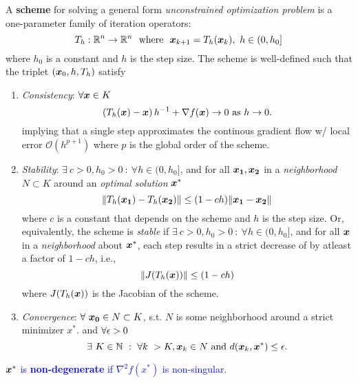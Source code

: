 \documentclass[11pt]{article}
\begin{document}
   

    \begin{definition}
        A \textbf{scheme} for solving a general form \emph{unconstrained optimization problem}
        is a one-parameter family of iteration operators:
        $$
            T_h : \mathbb{R}^n \rightarrow \mathbb{R}^n ~ \text{ where } ~\bm{x}_{k+1} = T_h(\bm{x}_k), ~ h \in (0, h_0]
        $$
        where $h_0$ is a constant and $h$ is the step size. The scheme is well-defined such that
        the triplet $(\bm{x}_0, h, T_h)$ satisfy
        \begin{enumerate}
            \item \emph{Consistency}: $\forall \bm{x} \in K$ 
            $$
                \left( T_h(\bm{x}) - \bm{x} \right) h^{-1} + \nabla f(\bm{x}) \rightarrow 0 \text{ as } h \rightarrow 0.
            $$
            implying that a single step approximates the continous gradient flow w/ local error
            $\mathcal{O}(h^{p+1})$ where $p$ is the global order of the scheme.
            \item \emph{Stability}: $\exists~ c > 0, h_0 > 0 ~:~ \forall h \in (0, h_0]$,
            and for all $\bm{x_1}, \bm{x_2}$ in a \emph{neighborhood $N \subset K$}
            around an \emph{optimal solution} $\bm{x}^*$
            $$
                \| T_h(\bm{x_1}) - T_h(\bm{x_2}) \| \leq (1 - ch) \| \bm{x_1} - \bm{x_2} \|
            $$
            where $c$ is a constant that depends on the scheme and $h$ is the step size.
            Or, equivalently, the scheme is \emph{stable} if
            $\exists~ c > 0, h_0 > 0 ~:~ \forall h \in (0, h_0]$,
            and for all $\bm{x}$ in a \emph{neighborhood} about $\bm{x}^*$,
            each step results in a strict decrease of by atleast a factor of $1 - ch$, i.e.,
            $$
            \| J(T_h(\bm{x})) \| \leq (1 - ch)
            $$
            where $J(T_h(\bm{x}))$ is the Jacobian of the scheme.
            \item \emph{Convergence}: $\forall~ \bm{x_0} \in N \subset K$, s.t. $N$ is some neighborhood
            around a strict minimizer $x^*$. and $\forall \epsilon > 0$ 
            $$
                \exists~ K \in \mathbb{N} ~:~ \forall k ~ > K, \bm{x}_k \in N \text{ and } 
                d(\bm{x}_k, \bm{x}^*) \leq \epsilon.
            $$
        \end{enumerate}
    \end{definition}

    \begin{definition}
        \textcolor{blue}{
            $\bm{x}^*$ is \textbf{non-degenerate} if $\nabla^2 f(x^*)$ is non-singular.
        }
    \end{definition}
\end{document}
